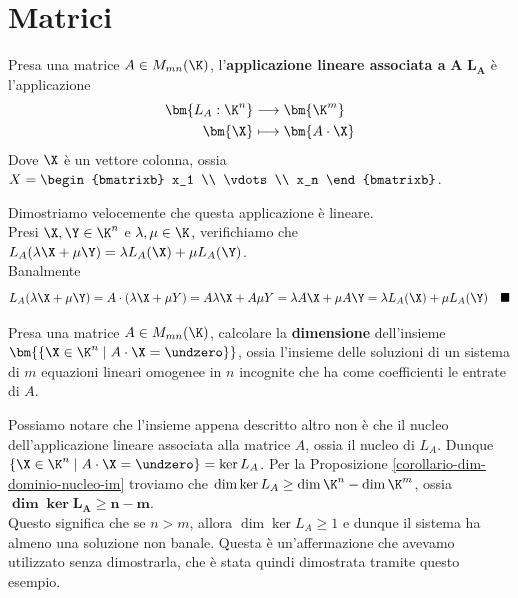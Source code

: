 \documentclass[11pt, a4paper, titlepage, oneside]{scrbook}
\begin{document}
\section{Matrici}

\begin{Definizione}
\label{def-app-lin-associata-matrice}
Presa una matrice $A \in M_{mn}(\K)$, l'\textbf{applicazione lineare associata a} $\bm{A}$ $\bm{L_A}$ è l'applicazione
\begin{align*}
\bm{L_A: \K^n} &\longrightarrow \bm{\K^m} \\
\bm{\X} &\longmapsto \bm{A \cdot \X} 
\end{align*}
Dove $\X$ è un vettore colonna, ossia $X = \begin{bmatrixb}
    x_1 \\ \vdots \\ x_n
\end{bmatrixb}$.
\end{Definizione}

Dimostriamo velocemente che questa applicazione è lineare. \\
Presi $\X, \Y \in \K^n$ e $\lambda, \mu \in \K$, verifichiamo che $L_A(\lambda \X + \mu \Y) = \lambda L_A(\X) + \mu L_A(\Y)$. \\ Banalmente
\[L_A(\lambda \X + \mu \Y) = A \cdot (\lambda \X + \mu Y) = A \lambda \X + A \mu Y = \lambda A \X + \mu A \Y = \lambda L_A(\X) + \mu L_A(\Y) \quad \blacksquare\]

\Esempio \nopagebreak

Presa una matrice $A \in M_{mn}(\K)$, calcolare la \textbf{dimensione} dell'insieme $\bm{\{\X \in \K^n \mid A \cdot \X = \undzero\}}$, ossia l'insieme delle soluzioni di un sistema di $m$ equazioni lineari omogenee in $n$ incognite che ha come coefficienti le entrate di $A$. \nopagebreak

Possiamo notare che l'insieme appena descritto altro non è che il nucleo dell'applicazione lineare associata alla matrice $A$, ossia il nucleo di $L_A$. Dunque $\{\X \in \K^n \mid A \cdot \X = \undzero\} = \ker L_A$. Per la Proposizione \ref{corollario-dim-dominio-nucleo-im} troviamo che $\dim \ker L_A \geq \dim \K^n - \dim \K^m$, ossia $\bm{\dim \ker L_A \geq n - m}$. \\Questo significa che se $n > m$, allora $\dim \ker L_A \geq 1$ e dunque il sistema ha almeno una soluzione non banale. Questa è un'affermazione che avevamo utilizzato senza dimostrarla, che è stata quindi dimostrata tramite questo esempio.
\end{document}
